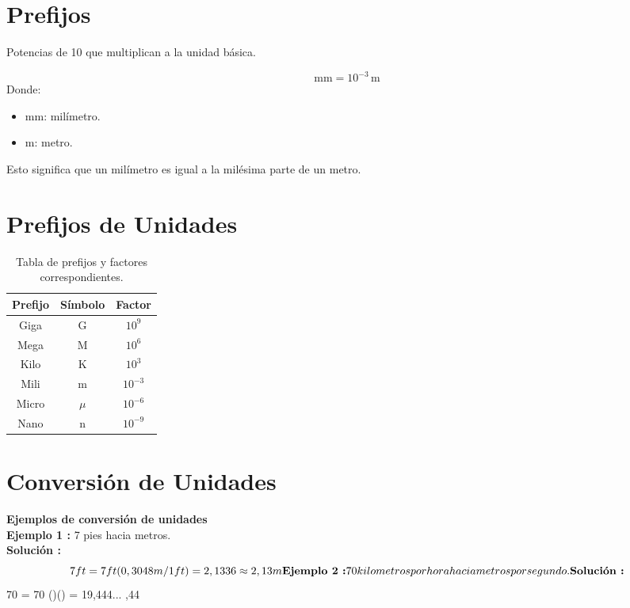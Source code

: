 \newpage
\section{Prefijos}

 Potencias de 10 que multiplican a la unidad básica.

\[
\text{mm} = 10^{-3} \, \text{m}
\]
Donde:
\begin{itemize}
    \item \( \text{mm} \): milímetro.
    \item \( \text{m} \): metro.
\end{itemize}

Esto significa que un milímetro es igual a la milésima parte de un metro.

\section*{Prefijos de Unidades}

\begin{table}[h!]
\centering
\begin{tabular}{|c|c|c|}
\hline
\textbf{Prefijo} & \textbf{Símbolo} & \textbf{Factor} \\ \hline
Giga & G & $10^9$ \\ \hline
Mega & M & $10^6$ \\ \hline
Kilo & K & $10^3$ \\ \hline
Mili & m & $10^{-3}$ \\ \hline
Micro & $\mu$ & $10^{-6}$ \\ \hline
Nano & n & $10^{-9}$ \\ \hline
\end{tabular}
\caption{Tabla de prefijos y factores correspondientes.}
\end{table}

\newpage
\section{Conversión de Unidades}

\textbf{Ejemplos de conversión de unidades}
\\[0.7cm]

\textbf{Ejemplo 1 :} 7 pies hacia metros.
\\
\textbf{Solución :}
\\$$
7 ft = 7ft (0,3048m/1ft) = 2,1336 \approx 2,13m
\\[0.7cm]

\textbf{Ejemplo 2 :} 70 kilometros por hora hacia metros por segundo.
\\
\textbf{Solución :}
\\$$
70  = 70  ()() = 19,444...  ,44
\\[0.7cm]

